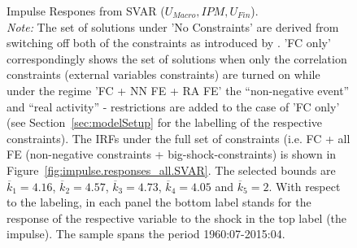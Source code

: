 \documentclass[a4paper,11pt,listof=nochaptergap,oneside,pointednumbers,bibtotoc,bigheadings,liststotoc,hidelinks]{scrbook}
\theoremstyle{mysatz}
\theoremstyle{mydefinition}
\theoremstyle{mytheorem}
\theoremstyle{mybemerkung}
\begin{document}
\begin{figure}[!h]
   \centering
   \setlength\fboxsep{0pt}
   \setlength\fboxrule{0pt}
      \caption[Impulse Respones from SVAR ($U_{Macro}, IPM, U_{Fin}$).]{Impulse Respones from SVAR ($U_{Macro}, IPM, U_{Fin}$).\\
      \textit{Note:} The set of solutions under 'No Constraints' are derived from switching off both of the constraints as introduced by \citet{ludvigsonetal:19}. 'FC only' correspondingly shows the set of solutions when only the correlation constraints (external variables constraints) are turned on while under the regime 'FC + NN FE + RA FE' the ``non-negative event'' and ``real activity'' - restrictions are added to the case of 'FC only' (see Section~\ref{sec:modelSetup} for the labelling of the respective constraints). The IRFs under the full set of constraints (i.e. FC + all FE (non-negative constraints + big-shock-constraints) is shown in Figure~\ref{fig:impulse.responses_all.SVAR}. The selected bounds are $\overline{k}_1 = 4.16$, $\overline{k}_2 = 4.57$, $\overline{k}_3 = 4.73$, $\overline{k}_4 = 4.05$ and $\overline{k}_5 = 2$. With respect to the labeling, in each panel the bottom label stands for the response of the respective variable to the shock in the top label (the impulse). The sample spans the period 1960:07-2015:04.}   \label{fig:impulse.responses_all.SVAR_UNCONSTR}
\end{figure}
\end{document}
